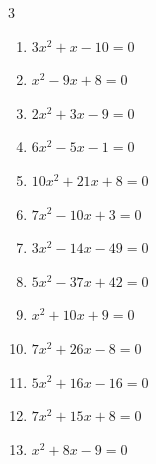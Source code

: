 \begin{multicols}{3}
\begin{enumerate}
  \item $3x^{2}+x-10=0$


  \item $x^{2}-9x+8=0$

        \phantom{$\displaystyle x=1,\; 8$}

  \item $2x^{2}+3x-9=0$


  \item $6x^{2}-5x-1=0$


\columnbreak %

  \item $10x^{2}+21x+8=0$


  \item $7x^{2}-10x+3=0$


  \item $3x^{2}-14x-49=0$


  \item $5x^{2}-37x+42=0$


  \item $x^{2}+10x+9=0$

        \phantom{$\displaystyle x=-1,\; -9$}

  \item $7x^{2}+26x-8=0$


  \item $5x^{2}+16x-16=0$


  \item $7x^{2}+15x+8=0$


  \item $x^{2}+8x-9=0$

        \phantom{$\displaystyle x=1,\; -9$}


\end{enumerate}
\end{multicols}
